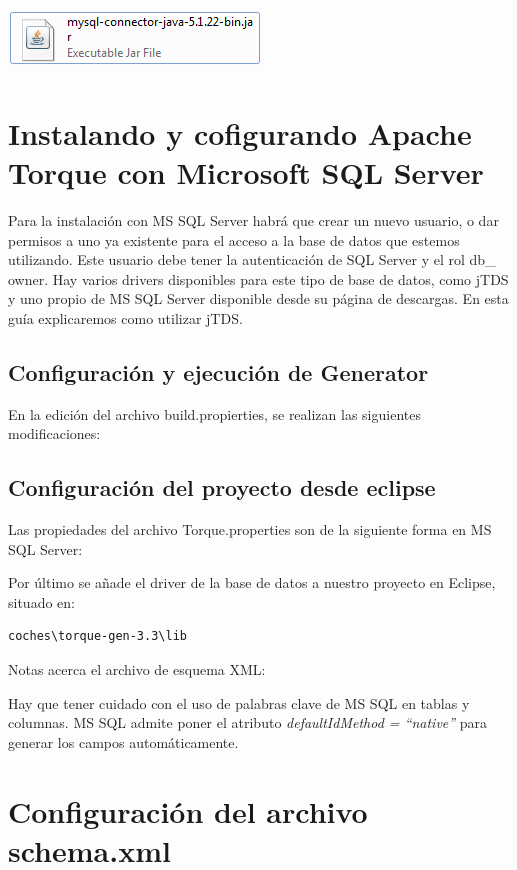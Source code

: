 \documentclass[12pt, oneside]{article}
\begin{document}
\begin{center}
	\includegraphics{img/mysql-file.png}
\end{center}

\section{Instalando y cofigurando Apache Torque con Microsoft SQL Server}
Para la instalación con MS SQL Server habrá que crear un nuevo usuario, o dar permisos a uno ya existente para el acceso a la base de datos que estemos utilizando. Este usuario debe tener la autenticación de SQL Server y el rol db\_ owner. Hay varios drivers disponibles para este tipo de base de datos, como jTDS y uno propio de MS SQL Server disponible desde su página de descargas. En esta guía explicaremos como utilizar jTDS.

\subsection{Configuración y ejecución de Generator}
En la edición del archivo build.propierties, se realizan las siguientes modificaciones:



\subsection{Configuración del proyecto desde eclipse}
Las propiedades del archivo Torque.properties son de la siguiente forma en MS SQL Server:


Por último se añade el driver de la base de datos a nuestro proyecto en Eclipse, situado en:
\begin{lstlisting}
coches\torque-gen-3.3\lib
\end{lstlisting}


Notas acerca el archivo de esquema XML:

Hay que tener cuidado con el uso de palabras clave de MS SQL en tablas y columnas. 
MS SQL admite poner el atributo {\em defaultIdMethod = “native”} para generar los campos automáticamente.

\section{Configuración del archivo schema.xml}
	
\end{document}
